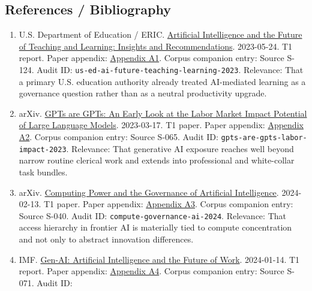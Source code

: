 \documentclass[
  american,
  11pt,
  letterpaper,
]{article}
\providecommand{\tightlist}{%
  \setlength{\itemsep}{0pt}\setlength{\parskip}{0pt}}
\begin{document}
\subsection{References / Bibliography}\label{references-bibliography}

\begin{enumerate}
\def\labelenumi{\arabic{enumi}.}
\tightlist
\item
  U.S. Department of Education / ERIC.
  \href{https://eric.ed.gov/?id=ED631097}{Artificial Intelligence and
  the Future of Teaching and Learning: Insights and Recommendations}.
  2023-05-24. T1 report. Paper appendix:
  \hyperref[appendix-a1-artificial-intelligence-and-the-future-of-teaching-and-learning-insights-and-recommendations]{Appendix
  A1}. Corpus companion entry: Source S-124. Audit ID:
  \texttt{us-ed-ai-future-teaching-learning-2023}. Relevance: That a
  primary U.S. education authority already treated AI-mediated learning
  as a governance question rather than as a neutral productivity
  upgrade.
\item
  arXiv. \href{https://arxiv.org/abs/2303.10130}{GPTs are GPTs: An Early
  Look at the Labor Market Impact Potential of Large Language Models}.
  2023-03-17. T1 paper. Paper appendix:
  \hyperref[appendix-a2-gpts-are-gpts-an-early-look-at-the-labor-market-impact-potential-of-large-language-models]{Appendix
  A2}. Corpus companion entry: Source S-065. Audit ID:
  \texttt{gpts-are-gpts-labor-impact-2023}. Relevance: That generative
  AI exposure reaches well beyond narrow routine clerical work and
  extends into professional and white-collar task bundles.
\item
  arXiv. \href{https://arxiv.org/abs/2402.08797}{Computing Power and the
  Governance of Artificial Intelligence}. 2024-02-13. T1 paper. Paper
  appendix:
  \hyperref[appendix-a3-computing-power-and-the-governance-of-artificial-intelligence]{Appendix
  A3}. Corpus companion entry: Source S-040. Audit ID:
  \texttt{compute-governance-ai-2024}. Relevance: That access hierarchy
  in frontier AI is materially tied to compute concentration and not
  only to abstract innovation differences.
\item
  IMF.
  \href{https://www.imf.org/en/publications/staff-discussion-notes/issues/2024/01/14/gen-ai-artificial-intelligence-and-the-future-of-work-542379}{Gen-AI:
  Artificial Intelligence and the Future of Work}. 2024-01-14. T1
  report. Paper appendix:
  \hyperref[appendix-a4-gen-ai-artificial-intelligence-and-the-future-of-work]{Appendix
  A4}. Corpus companion entry: Source S-071. Audit ID:

\end{enumerate}
\end{document}
